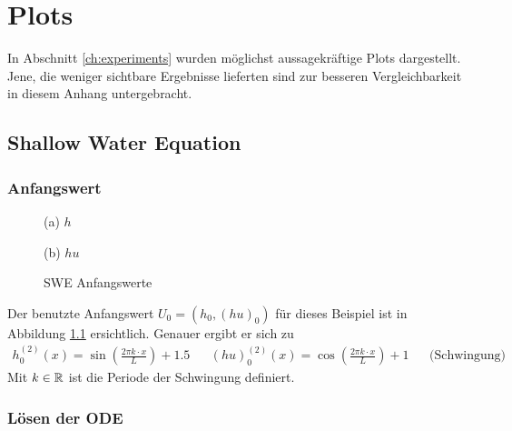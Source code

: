 \chapter{Plots}
 In Abschnitt \ref{ch:experiments} wurden möglichst aussagekräftige Plots dargestellt. Jene, die weniger sichtbare Ergebnisse lieferten sind zur besseren Vergleichbarkeit in diesem Anhang untergebracht.



\section{Shallow Water Equation}\label{sec:sweU2}
\subsection{Anfangswert}
\begin{figure}[H]
\footnotesize
\centering
\begin{minipage}[b]{0.49\linewidth}

\caption*{(a) $h$}
\end{minipage}
\begin{minipage}[b]{0.49\linewidth}

\caption*{(b) $hu$}
\end{minipage}
\caption{SWE Anfangswerte}
\label{fig:sweInitialValues2}
\end{figure}
Der benutzte Anfangswert $U_0 = (h_0,(hu)_0)$ für dieses Beispiel ist in Abbildung \ref{fig:sweInitialValues2} ersichtlich. Genauer ergibt er sich zu
\[
\begin{aligned}
 h_0^{(2)}(x)= \sin\left( \frac{2\pi k\cdot x}{L}\right) + 1.5 &&(hu)_0^{(2)}(x) = \cos\left( \frac{2\pi k\cdot x}{L}\right) + 1  && \text{(Schwingung)}
\end{aligned}
\]
Mit $k\in \mathbb{R}$ ist die Periode der Schwingung definiert. 
\subsection{Lösen der ODE}

